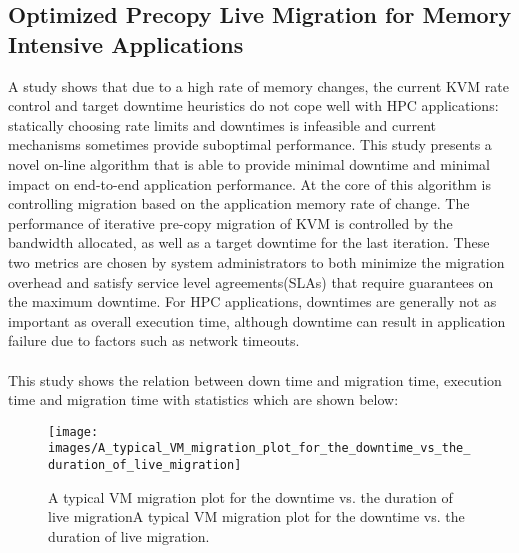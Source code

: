 \documentclass[runningheads]{llncs}
\begin{document}
\subsection{Optimized Precopy Live Migration for Memory Intensive Applications}
A study shows that due to a high rate of memory changes, the current KVM rate control and target downtime heuristics do not cope well with HPC applications: statically choosing rate limits and downtimes is infeasible and current mechanisms sometimes provide suboptimal performance. This study presents a novel on-line algorithm that is able to provide minimal downtime and minimal impact on end-to-end application performance. At the core of this algorithm is controlling migration based on the application memory rate of change.
The performance of iterative pre-copy migration of KVM is controlled by the bandwidth allocated, as well as a target downtime for the last iteration. These two metrics are chosen by system administrators to both minimize the migration overhead and satisfy service level agreements(SLAs) that require guarantees on the maximum downtime. For HPC applications, downtimes are generally not as important as overall execution time, although downtime can result in application failure due to factors such as network timeouts.
\\\\
This study shows the relation between down time and migration time, execution time and migration time with statistics which are shown below:
\begin{figure}
\centering
\texttt{[image: images/A\_typical\_VM\_migration\_plot\_for\_the\_downtime\_vs\_the\_duration\_of\_live\_migration]}
\caption{A typical VM migration plot for the downtime vs. the duration of live migrationA typical VM migration plot for the downtime vs. the duration of live migration. }
\end{figure}
\end{document}
